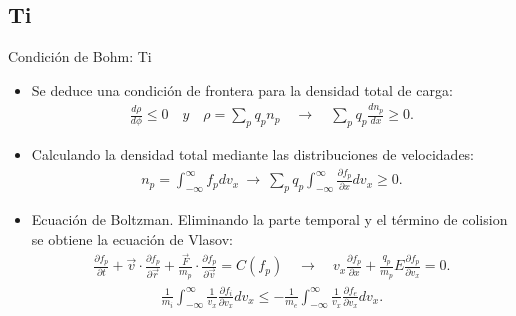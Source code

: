 \documentclass[11pt]{beamer}
\begin{document}
    \subsection{Ti  }
        \begin{frame}{Condici\'on de Bohm: Ti }
        \fontsize{7pt}{9}\selectfont
        
        \begin{itemize}
            \item Se deduce una condición de frontera para la densidad total de carga:
            \begin{align*}
                \frac{d\rho}{d\phi} \leq 0\hspace{1em}y\hspace{1em}\rho = \sum_p q_pn_p\hspace{1em} \rightarrow\hspace{1em} \sum_p q_p \frac{dn_p}{dx} \geq 0.
            \end{align*} 
            \item Calculando la densidad total mediante las distribuciones de velocidades:
            \begin{align*}
                n_p = \int_{-\infty}^{\infty} f_p dv_x \ \rightarrow \
                \sum_p q_p \int_{-\infty}^{\infty}\frac{\partial f_p}{\partial x}dv_x \geq 0.
            \end{align*} 
            \item Ecuación de Boltzman. Eliminando la parte temporal y el término de colision se obtiene la ecuación de Vlasov:
            \begin{align*}
                \frac{\partial f_p}{\partial t} + \vec v\cdot\frac{\partial f_p}{\partial \vec r} +\frac{\vec F}{m_p} \cdot\frac{\partial f_p}{\partial \vec v} = C\left(f_p\right)\hspace{1em}\rightarrow\hspace{1em}
                 v_x\frac{\partial f_p}{\partial x} + \frac{q_p}{m_p}E\frac{\partial f_p}{\partial v_x} = 0.
            \end{align*} 
            \begin{align*}
                 \frac{1}{m_i} \int_{-\infty}^{\infty} \frac{1}{v_x}\frac{\partial f_i}{\partial v_x}dv_x \leq  -\frac{1}{m_e} \int_{-\infty}^{\infty} \frac{1}{v_x}\frac{\partial f_e}{\partial v_x} dv_x.
            \end{align*}
            
        \end{itemize}
        

            
        \end{frame}
   
\end{document}
